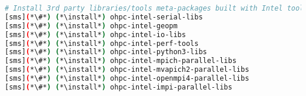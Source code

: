 
\begin{lstlisting}[language=bash,keywords={},upquote=true,keepspaces]
# Install 3rd party libraries/tools meta-packages built with Intel toolchain
[sms](*\#*) (*\install*) ohpc-intel-serial-libs
[sms](*\#*) (*\install*) ohpc-intel-geopm
[sms](*\#*) (*\install*) ohpc-intel-io-libs
[sms](*\#*) (*\install*) ohpc-intel-perf-tools
[sms](*\#*) (*\install*) ohpc-intel-python3-libs
[sms](*\#*) (*\install*) ohpc-intel-mpich-parallel-libs
[sms](*\#*) (*\install*) ohpc-intel-mvapich2-parallel-libs
[sms](*\#*) (*\install*) ohpc-intel-openmpi4-parallel-libs
[sms](*\#*) (*\install*) ohpc-intel-impi-parallel-libs
\end{lstlisting}

